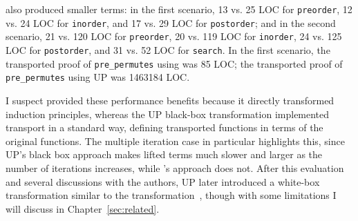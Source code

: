 \toolnamec also produced smaller terms:
in the first scenario, 13 vs. 25 LOC for \lstinline{preorder},
12 vs. 24 LOC for \lstinline{inorder}, and 17 vs. 29 LOC for \lstinline{postorder};
and in the second scenario, 21 vs. 120 LOC for \lstinline{preorder}, 20 vs. 119 LOC for \lstinline{inorder}, 
24 vs. 125 LOC for \lstinline{postorder}, and 31 vs. 52 LOC for \lstinline{search}.
In the first scenario, the transported proof of \lstinline{pre_permutes} using \toolnameb was 85 LOC;
the transported proof of \lstinline{pre_permutes} using UP was 1463184 LOC.

I suspect \toolnamec provided these performance benefits because it directly
transformed induction principles, whereas the UP black-box transformation implemented transport in a standard way,
defining transported functions in terms of the original functions. 
The multiple iteration case in particular highlights this,
since UP's black box approach makes lifted terms much slower and larger as the number of iterations increases,
while \toolnamec's approach does not.
After this evaluation and several discussions with the authors, UP later introduced a white-box
transformation similar to the \toolnamec transformation~\cite{tabareau2019marriage},
though with some limitations I will discuss in Chapter~\ref{sec:related}.


